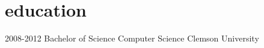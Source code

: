 
\section{education}

\begin{entrylist}


\entry
{2008-2012}
{Bachelor of Science {\normalfont Computer Science}}
{Clemson University}
{}


\end{entrylist}
